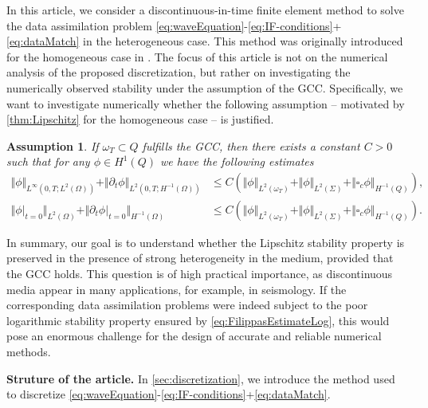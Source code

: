 \documentclass[sn-mathphys-num]{sn-jnl}
\newtheorem{assum}{Assumption}
\numberwithin{equation}{section}
\newcommand{\dt}{\partial_t}
\begin{document}

In this article, we consider a discontinuous-in-time finite element method to solve the data assimilation problem \eqref{eq:waveEquation}-\eqref{eq:IF-conditions}+\eqref{eq:dataMatch} in the heterogeneous case. This method was originally introduced for the homogeneous case in \cite{BP24}. The focus of this article is not on the numerical analysis of the proposed discretization, but rather on investigating the numerically observed stability under the assumption of the GCC. Specifically, we want to investigate numerically whether the following assumption -- motivated by \cref{thm:Lipschitz} for the homogeneous case -- is justified. 

\begin{assum}\label{assum:LipschitzStability}
    If $\omega_T \subset Q$ fulfills the GCC, then there exists a constant $C > 0$ such that for any $\phi \in H^1(Q)$ we have the following estimates
    \begin{align*}
        \Vert \phi \Vert_{L^\infty(0,T;L^2(\Omega))} + \Vert \dt \phi \Vert_{L^2(0,T;H^{-1}(\Omega))} &\le C \left(  \Vert \phi \Vert_{L^2(\omega_T)} + \Vert \phi \Vert_{L^2(\Sigma)} + \Vert \square_c \phi \Vert_{H^{-1}(Q)} \right), \\
        \Vert \phi \vert_{t = 0} \Vert_{L^2(\Omega)} + \Vert \dt \phi \vert_{t = 0} \Vert_{H^{-1}(\Omega)} &\le C \left(\Vert \phi \Vert_{L^2(\omega_T)} + \Vert \phi \Vert_{L^2(\Sigma)} + \Vert \square_c \phi \Vert_{H^{-1}(Q)} \right). 
    \end{align*}
\end{assum}

In summary, our goal is to understand whether the Lipschitz stability property is preserved in the presence of strong heterogeneity in the medium, provided that the GCC holds. This question is of high practical importance, as discontinuous media appear in many applications, for example, in seismology. If the corresponding data assimilation problems were indeed subject to the poor logarithmic stability property ensured by \eqref{eq:FilippasEstimateLog}, this would pose an enormous challenge for the design of accurate and reliable numerical methods. 

\vspace*{1cm}
\noindent \textbf{Struture of the article.} In \cref{sec:discretization}, we introduce the method used to discretize \eqref{eq:waveEquation}-\eqref{eq:IF-conditions}+\eqref{eq:dataMatch}. 
\end{document}
